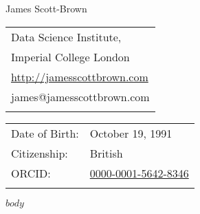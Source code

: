 \documentclass[letterpaper]{article}
\def\name{James Scott-Brown}
\begin{document}
{\huge \name}


\vspace{0.25in}
\begin{minipage}[t]{0.5\textwidth}
\begin{tabular}{l}  	
Data Science Institute,\\
Imperial College London\\
\href{http://jamesscottbrown.com}{http://jamesscottbrown.com}\\
james@jamesscottbrown.com \\ \\
\end{tabular}
\end{minipage}
\begin{minipage}[t]{0.5\textwidth}
\begin{tabular}{ll}  	
Date of Birth: &October 19, 1991 \\
Citizenship: &British \\
ORCID: &\href{https://orcid.org/0000-0001-5642-8346}{0000-0001-5642-8346} \\ \\
\end{tabular}
\end{minipage}

$body$

\vspace{0.3 cm}
\end{document}
